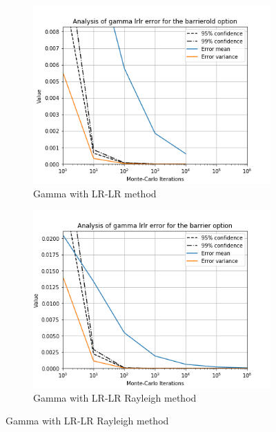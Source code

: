 \documentclass[11pt,a4paper,fleqn]{article}
\begin{document}
\begin{figure}[h!]
      \begin{subfigure}[b]{0.45\textwidth}
          \includegraphics[width=\textwidth]{graphs/barrieroldgammalrlr.png}
          \caption{Gamma with LR-LR method}
      \end{subfigure}
      \begin{subfigure}[b]{0.45\textwidth}
          \includegraphics[width=\textwidth]{graphs/barriergammalrlr.png}
          \caption{Gamma with LR-LR Rayleigh method}
      \end{subfigure}


\end{figure}
\end{document}
